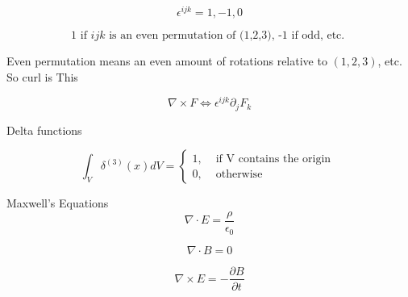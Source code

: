\documentclass{article}
\newtheorem{one minute paper}[theorem]{One Minute Paper}
\begin{document}
\begin{equation}
    \epsilon^{ijk} = 1, -1, 0
\end{equation}

\begin{equation}
    1 \textrm{ if $ijk$ is an even permutation of (1,2,3), -1 if odd, etc. }
\end{equation}

Even permutation means an even amount of rotations relative to $(1,2,3)$, etc. So curl is This

\begin{equation}
    \nabla \times F \iff \epsilon^{ijk}\partial_j F_k
\end{equation}

Delta functions

\begin{equation}
    \int_{V}\delta^(3)(x)dV = \begin{cases}
        1, & \text{ if V contains the origin } \\
        0, & \text{ otherwise  }
    \end{cases}
\end{equation}

Maxwell's Equations
\begin{equation}
    \nabla \cdot E = \frac{\rho}{\epsilon_0}
\end{equation}

\begin{equation}
    \nabla \cdot B = 0
\end{equation}

\begin{equation}
    \nabla \times E = -\frac{\partial B}{\partial t}
\end{equation}
\end{document}
